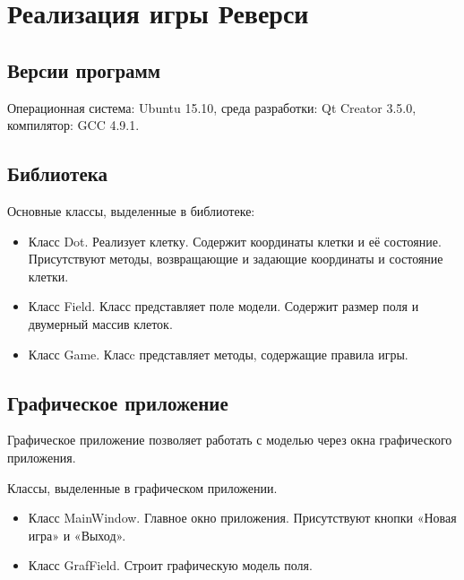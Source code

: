\documentclass[a4paper]{article}
\begin{document}
\section{Реализация игры Реверси}
\subsection{Версии программ}
Операционная система: Ubuntu 15.10, среда разработки: Qt Creator 3.5.0, компилятор: GCC 4.9.1.


\subsection{Библиотека}
\noindent Основные классы, выделенные в библиотеке:
\begin{itemize}
\item Класс Dot. Реализует клетку. Содержит координаты клетки и её состояние. Присутствуют методы, возвращающие и задающие координаты и состояние клетки.
\item Класс Field. Класс представляет поле модели. Содержит размер поля и двумерный массив клеток.
\item Класс Game. Класc представляет методы, содержащие правила игры.
\end{itemize}

\subsection{Графическое приложение}
Графическое приложение позволяет работать с моделью через окна графического приложения.

\noindent Классы, выделенные в графическом приложении. 
\begin{itemize}
\item Класс MainWindow. Главное окно приложения. Присутствуют кнопки «Новая игра» и «Выход».

\item Класс GrafField. Строит графическую модель поля.
\end{itemize}
\end{document}
